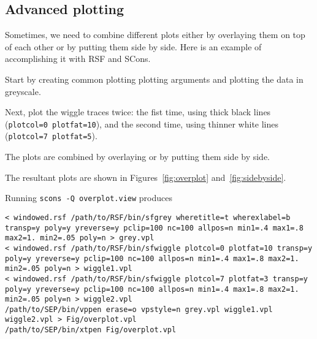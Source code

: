 
\subsection{Advanced plotting}

Sometimes, we need to combine different plots either by overlaying
them on top of each other or by putting them side by side. Here is an
example of accomplishing it with RSF and SCons.

Start by creating common plotting plotting arguments and plotting the
data in greyscale. 



Next, plot the wiggle traces twice: the fist time, using thick black
lines (\texttt{plotcol=0 plotfat=10}), and the second time, using
thinner white lines (\texttt{plotcol=7 plotfat=5}).



The plots are combined by overlaying or by putting them side by side.



The resultant plots are shown in Figures~\ref{fig:overplot} and~\ref{fig:sidebyside}. 



Running \texttt{scons -Q overplot.view} produces 
\begin{verbatim}
< windowed.rsf /path/to/RSF/bin/sfgrey wheretitle=t wherexlabel=b transp=y poly=y yreverse=y pclip=100 nc=100 allpos=n min1=.4 max1=.8 max2=1. min2=.05 poly=n > grey.vpl
< windowed.rsf /path/to/RSF/bin/sfwiggle plotcol=0 plotfat=10 transp=y poly=y yreverse=y pclip=100 nc=100 allpos=n min1=.4 max1=.8 max2=1. min2=.05 poly=n > wiggle1.vpl
< windowed.rsf /path/to/RSF/bin/sfwiggle plotcol=7 plotfat=3 transp=y poly=y yreverse=y pclip=100 nc=100 allpos=n min1=.4 max1=.8 max2=1. min2=.05 poly=n > wiggle2.vpl
/path/to/SEP/bin/vppen erase=o vpstyle=n grey.vpl wiggle1.vpl wiggle2.vpl > Fig/overplot.vpl
/path/to/SEP/bin/xtpen Fig/overplot.vpl
\end{verbatim}

